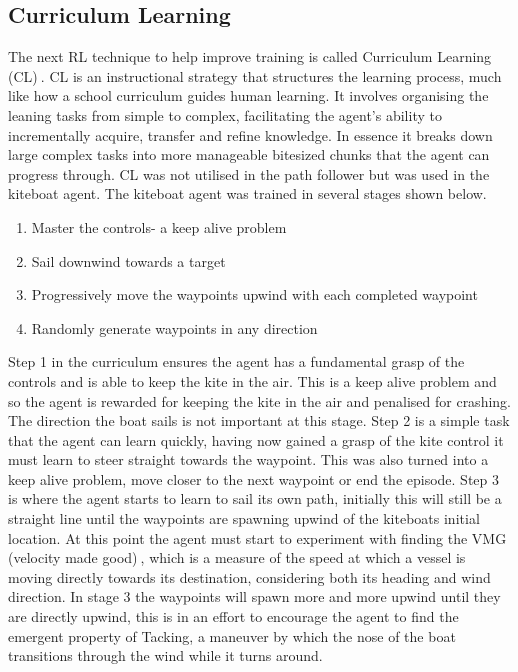 \subsection{Curriculum Learning}
The next RL technique to help improve training is called Curriculum Learning (CL)$~$\cite{curriculumLearning}. CL is an instructional strategy that structures the learning process, much like how a school curriculum guides human learning. It involves organising the leaning tasks from simple to complex, facilitating the agent's ability to incrementally acquire, transfer and refine knowledge. In essence it breaks down large complex tasks into more manageable bitesized chunks that the agent can progress through. CL was not utilised in the path follower but was used in the kiteboat agent. The kiteboat agent was trained in several stages shown below.
\begin{enumerate}
    \item Master the controls- a keep alive problem
    \item Sail downwind towards a target
    \item Progressively move the waypoints upwind with each completed waypoint
    \item Randomly generate waypoints in any direction 
\end{enumerate}

Step 1 in the curriculum ensures the agent has a fundamental grasp of the controls and is able to keep the kite in the air. This is a keep alive problem and so the agent is rewarded for keeping the kite in the air and penalised for crashing. The direction the boat sails is not important at this stage. Step 2 is a simple task that the agent can learn quickly, having now gained a grasp of the kite control it must learn to steer straight towards the waypoint. This was also turned into a keep alive problem, move closer to the next waypoint or end the episode. Step 3 is where the agent starts to learn to sail its own path, initially this will still be a straight line until the waypoints are spawning upwind of the kiteboats initial location. At this point the agent must start to experiment with finding the VMG (velocity made good)$~$\cite{vmg}, which is a measure of the speed at which a vessel is moving directly towards its destination, considering both its heading and wind direction. In stage 3 the waypoints will spawn more and more upwind until they are directly upwind, this is in an effort to encourage the agent to find the emergent property of Tacking, a maneuver by which the nose of the boat transitions through the wind while it turns around.  

